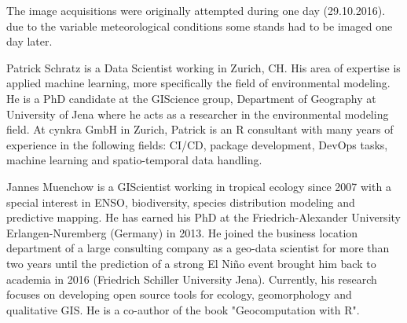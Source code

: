 \documentclass[peerreview]{IEEEtran}
\begin{document}
The image acquisitions were originally attempted during one day (29.10.2016).
due to the variable meteorological conditions some stands had to be imaged one day later.

\pagebreak




\pagebreak

\begin{IEEEbiography}
	{Patrick Schratz}
	is a Data Scientist working in Zurich, CH.
	His area of expertise is applied machine learning, more specifically the field of environmental modeling.
	He is a PhD candidate at the GIScience group, Department of Geography at University of Jena where he acts as a researcher in the environmental modeling field.
	At cynkra GmbH in Zurich, Patrick is an R consultant with many years of experience in the following fields: CI/CD, package development, DevOps tasks, machine learning and spatio-temporal data handling.
\end{IEEEbiography}
\begin{IEEEbiography}
	{Jannes Muenchow}
	is a GIScientist working in tropical ecology since 2007 with a special interest in ENSO, biodiversity, species distribution modeling and predictive mapping.
	He has earned his PhD at the Friedrich-Alexander University Erlangen-Nuremberg (Germany) in 2013.
	He joined the business location department of a large consulting company as a geo-data scientist for more than two years until the prediction of a strong El Niño event brought him back to academia in 2016 (Friedrich Schiller University Jena).
	Currently, his research focuses on developing open source tools for ecology, geomorphology and qualitative GIS.
	He is a co-author of the book "Geocomputation with R".
\end{IEEEbiography}
\end{document}
